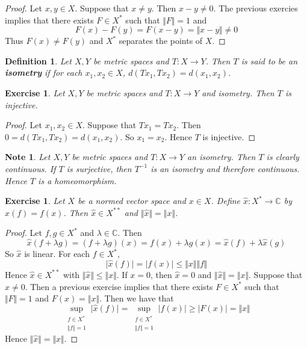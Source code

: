 \documentclass[12pt]{amsart}
\newtheorem{defn}[thm]{Definition}
\newtheorem{note}[thm]{Note}
\newtheorem{ex}[thm]{Exercise}
\newcommand{\lam}{\lambda}
\newcommand{\C}{\mathbb{C}}
\newcommand{\n}{\Vert}
\begin{document}
\begin{proof}
Let $x, y \in X$. Suppose that $x \neq y$. Then $x-y \neq 0$. The previous exercies implies that there exists $F \in X^*$ such that $\n F \n = 1$ and $$F(x) - F(y) = F(x-y) = \n x-y \n \neq 0$$ Thus $F(x) \neq F(y)$ and $X^*$ separates the points of $X$.
\end{proof}

\begin{defn}
Let $X, Y$ be metric spaces and $T : X \rightarrow Y$. Then $T$ is said to be an \textbf{isometry} if for each $x_1, x_2 \in X$, $d( Tx_1, Tx_2) = d(x_1,x_2) $.
\end{defn}

\begin{ex}
Let $X,Y$ be metric spaces and $T:X \rightarrow Y$ and isometry. Then $T$ is injective.
\end{ex}

\begin{proof}
Let $x_1, x_2 \in X$. Suppose that $Tx_1=Tx_2$. Then $0= d( Tx_1, Tx_2) = d(x_1,x_2)$. So $x_1 = x_2$. Hence $T$ is injective.
\end{proof}

\begin{note}
Let $X,Y$ be metric spaces and $T:X \rightarrow Y$ an isometry. Then $T$ is clearly continuous. If $T$ is surjective, then $T^{-1}$ is an isometry and therefore continuous. Hence $T$ is a homeomorphism.
\end{note}

\begin{ex}
Let $X$ be a normed vector space and $x \in X$. Define $\hat{x}:X^* \rightarrow \C$ by $\hat{x}(f) = f(x)$. Then $\hat{x} \in X^{**}$ and $\n \hat{x} \n = \n x \n$.
\end{ex}

\begin{proof}
Let $f,g \in X^*$ and $\lam \in \C$. Then $$\hat{x}(f+\lam g) = (f+ \lam g)(x) = f(x) + \lam g(x) = \hat{x}(f) + \lam \hat{x}(g)$$
So $\hat{x}$ is linear. For each $f \in X^*$, $$\vert \hat{x}(f) \vert = \vert f(x) \vert \leq \n x \n \n f \n $$ Hence $\hat{x} \in X^{**}$ with $\n \hat{x} \n \leq \n x \n$. If $x=0$, then $\hat{x} = 0$ and $\n \hat{x} \n = \n x \n$. Suppose that $x \neq 0$. Then a previous exercise implies that there exists $F \in X^*$ such that $\n F \n =1$ and $F(x) = \n x \n$. Then we have that $$\sup_{\substack{f \in X^* \\ \n f \n = 1 } } \vert \hat{x}(f) \vert  = \sup_{\substack{f \in X^* \\ \n f \n = 1 }}  \vert f(x) \vert \geq \vert F(x) \vert = \n x \n$$
Hence $\n \hat{x} \n = \n x \n$.
\end{proof}
\end{document}
